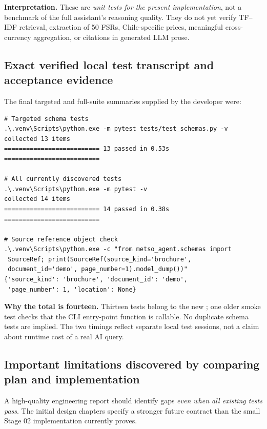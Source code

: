 \documentclass[11pt,a4paper]{article}
\DeclareRobustCommand{\code}[1]{{\ttfamily\small\detokenize{#1}}}
\begin{document}
\textbf{Interpretation.} These are \emph{unit tests for the present implementation}, not a benchmark of the full assistant's reasoning quality. They do not yet verify TF--IDF retrieval, extraction of 50 FSRs, Chile-specific prices, meaningful cross-currency aggregation, or citations in generated LLM prose.

\subsection{Exact verified local test transcript and acceptance evidence}
The final targeted and full-suite summaries supplied by the developer were:
\begin{Verbatim}[fontsize=\footnotesize]
# Targeted schema tests
.\.venv\Scripts\python.exe -m pytest tests/test_schemas.py -v
collected 13 items
========================== 13 passed in 0.53s ==========================

# All currently discovered tests
.\.venv\Scripts\python.exe -m pytest -v
collected 14 items
========================== 14 passed in 0.38s ==========================

# Source reference object check
.\.venv\Scripts\python.exe -c "from metso_agent.schemas import
 SourceRef; print(SourceRef(source_kind='brochure',
 document_id='demo', page_number=1).model_dump())"
{'source_kind': 'brochure', 'document_id': 'demo',
 'page_number': 1, 'location': None}
\end{Verbatim}
\textbf{Why the total is fourteen.} Thirteen tests belong to the new \code{test_schemas.py}; one older smoke test checks that the CLI entry-point function is callable. No duplicate schema tests are implied. The two timings reflect separate local test sessions, not a claim about runtime cost of a real AI query.

\subsection{Important limitations discovered by comparing plan and implementation}
A high-quality engineering report should identify gaps \emph{even when all existing tests pass}. The initial design chapters specify a stronger future contract than the small Stage 02 implementation currently proves.
\end{document}
